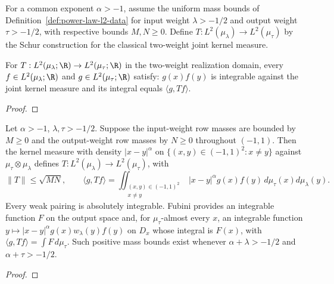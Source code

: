 \begin{supporting}
\begin{definition}
\label{def:power-law-two-weight-l2}
\leanok
For a common exponent $\alpha>-1$, assume the uniform mass bounds of Definition~\ref{def:power-law-l2-data} for input
weight $\lambda>-1/2$ and output weight $\tau>-1/2$, with respective bounds
$M,N\ge0$. Define $T:L^2(\mu_\lambda)\to L^2(\mu_\tau)$ by the Schur
construction for the classical two-weight joint kernel measure.
\end{definition}
\begin{theorem}
\label{thm:power-law-two-weight-characterisation}
\leanok
For $T:L^2(\mu_\lambda;\R)\to L^2(\mu_\tau;\R)$ in the two-weight realization domain, every $f\in L^2(\mu_\lambda;\R)$ and $g\in L^2(\mu_\tau;\R)$ satisfy:
$g(x)f(y)$ is integrable against the joint kernel measure and its integral
equals $\langle g,Tf\rangle$.
\end{theorem}
\begin{proof}
\leanok
\end{proof}
\end{supporting}


\begin{theorem}
\label{thm:power-law-two-weight-l2}
\leanok
Let $\alpha>-1$, $\lambda,\tau>-1/2$. Suppose the input-weight row masses
are bounded by $M\ge0$ and the output-weight row masses by $N\ge0$ throughout
$(-1,1)$. Then the kernel measure
with density $|x-y|^\alpha$ on $\{(x,y)\in(-1,1)^2:x\ne y\}$
against $\mu_\tau\otimes\mu_\lambda$ defines
$T:L^2(\mu_\lambda)\to L^2(\mu_\tau)$, with
\[
 \|T\|\le\sqrt{MN},\qquad
 \langle g,Tf\rangle=\iint_{\substack{(x,y)\in(-1,1)^2\\x\ne y}} |x-y|^\alpha g(x)f(y)\,
 d\mu_\tau(x)d\mu_\lambda(y).
\]
Every weak pairing is absolutely integrable. Fubini provides an integrable
function $F$ on the output space and, for $\mu_\tau$-almost every $x$, an integrable function $y\mapsto |x-y|^\alpha g(x)w_\lambda(y)f(y)$ on $D_x$ whose integral is $F(x)$, with
$\langle g,Tf\rangle=\int F\,d\mu_\tau$.
Such positive mass bounds exist whenever
$\alpha+\lambda>-1/2$ and $\alpha+\tau>-1/2$.

\end{theorem}
\begin{proof}
\leanok
\end{proof}

